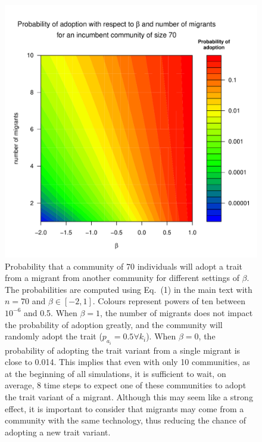 \documentclass[9pt,twoside,lineno]{pnas-new}
\begin{document}
\begin{figure} %
    \centering
    \includegraphics[width=.7\textwidth]{FigsSM/BetaProba.pdf}
    \caption{Probability that a community of 70 individuals will adopt a trait from a migrant from another community for different settings of $\beta$. The probabilities are computed using Eq.~(1) in the main text with $n=70$ and $\beta \in [-2,1]$. Colours represent powers of ten between $10^{-6}$ and 0.5. 
    When $\beta = 1$, the number of migrants does not impact the probability of adoption greatly, and the community will randomly adopt the trait ($p_{a_i}=0.5 \forall k_i$). 
    When $\beta = 0$, the probability of adopting the trait variant from a single migrant is close to 0.014. This implies that even with only 10 communities, as at the beginning of all simulations, it is sufficient to wait, on average, 8 time steps to expect one of these communities to adopt the trait variant of a migrant. Although this may seem like a strong effect, it is important to consider that migrants may come from a community with the same technology, thus reducing the chance of adopting a new trait variant.}

    \label{fig:betaexplor}
\end{figure}
\end{document}
